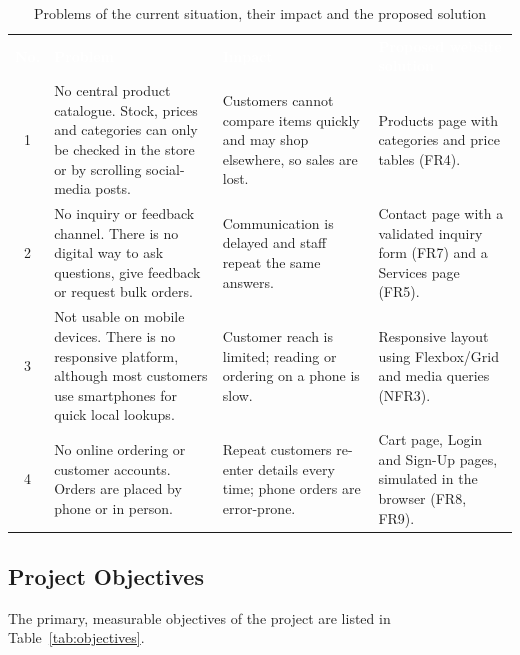 \documentclass[10pt,a4paper]{article}
\newcommand{\hc}[1]{\textcolor{white}{\bfseries #1}}
\newcommand{\tbl}{\rowcolors{2}{white}{gkbg}\renewcommand{\arraystretch}{1.2}\footnotesize}
\begin{document}
\begin{table}[H]
\centering
\caption{Problems of the current situation, their impact and the proposed solution}\label{tab:problems}
\tbl
\begin{tabularx}{\textwidth}{@{}cY Y Y@{}}
\hc{No.} & \hc{Problem} & \hc{Impact} & \hc{Proposed website solution}\\
1 & No central product catalogue. Stock, prices and categories can only be checked in the store or by scrolling social-media posts. & Customers cannot compare items quickly and may shop elsewhere, so sales are lost. & Products page with categories and price tables (FR4).\\
2 & No inquiry or feedback channel. There is no digital way to ask questions, give feedback or request bulk orders. & Communication is delayed and staff repeat the same answers. & Contact page with a validated inquiry form (FR7) and a Services page (FR5).\\
3 & Not usable on mobile devices. There is no responsive platform, although most customers use smartphones for quick local lookups. & Customer reach is limited; reading or ordering on a phone is slow. & Responsive layout using Flexbox/Grid and media queries (NFR3).\\
4 & No online ordering or customer accounts. Orders are placed by phone or in person. & Repeat customers re-enter details every time; phone orders are error-prone. & Cart page, Login and Sign-Up pages, simulated in the browser (FR8, FR9).\\
\end{tabularx}
\end{table}

\subsection{Project Objectives}
The primary, measurable objectives of the project are listed in Table~\ref{tab:objectives}.
\end{document}
